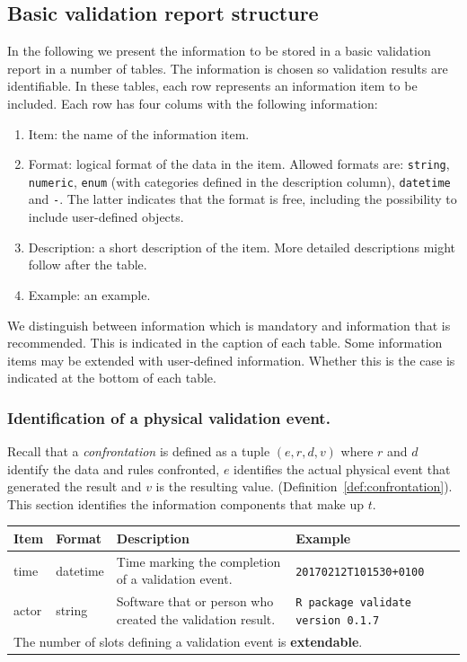 \documentclass[a4paper, 11pt,titlepage]{article}
\newcommand{\code}[1]{\texttt{#1}}
\begin{document}
\subsection{Basic validation report structure}
\label{sect:basicreportstructure}
In the following we present the information to be stored in a basic validation
report in a number of tables. The information is chosen so validation results
are identifiable. In these tables, each row represents an information item to
be included. Each row has four colums with the following information:
%
\begin{enumerate}
\item Item: the name of the information item.
\item Format: logical format of the data in the item. Allowed formats are: \code{string},
\code{numeric}, \code{enum} (with categories defined in the description
column), \code{datetime} and \code{-}. The latter indicates that the format is
free, including the possibility to include user-defined objects.
\item Description: a short description of the item. More detailed descriptions
might follow after the table.
\item Example: an example.
\end{enumerate}
%
We distinguish between information which is mandatory and information that
is recommended. This is indicated in the caption of each table. Some
information items may be extended with user-defined information. Whether
this is the case is indicated at the bottom of each table.


\subsubsection{Identification of a physical validation event.}
\label{sect:idevent}
Recall that a \emph{confrontation} is defined as a tuple $(e,r,d,v)$ where $r$
and $d$ identify the data and rules confronted, $e$ identifies the actual
physical event that generated the result and $v$ is the resulting value.
(Definition~\ref{def:confrontation}). This section identifies the information
components that make up $t$.
%
\begin{center}
\label{tab:idve}
\begin{tabular}{|lp{15mm}p{}p{}|}
\hline
\textbf{Item} & \textbf{Format} & \textbf{Description} &\textbf{Example}\\
\hline
time          & datetime & Time marking the completion of a validation event. & \code{20170212T101530+0100}\\
actor         & string   & Software that or person who created the validation result. & \code{R package validate version 0.1.7}\\
\hline
\multicolumn{4}{|l|}{The number of slots defining a validation event is \textbf{extendable}.
}\\
\hline
\end{tabular}
\end{center}
\end{document}
